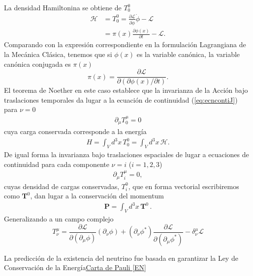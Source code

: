 \begin{frame}
La densidad Hamiltonina se obtiene de $T^0_0$
\begin{align}
  \label{eq:3}
\mathcal{H}&=T^0_0=\frac{\partial\mathcal{L}}{\partial\dot{\phi}}\dot{\phi}
      -\mathcal{L}\\
      &=\pi(x)\frac{\partial\phi(x)}{\partial t}-\mathcal{L}.
\end{align}
Comparando con la expresi\'on correspondiente en la formulaci\'on
Lagrangiana de la Mec\'anica Cl\'asica, tenemos que si $\phi(x)$ es la
variable can\'onica, la variable can\'onica conjugada es $\pi(x)$
\begin{equation}
  \label{eq:4}
  \pi(x)=\frac{\partial\mathcal{L}}{\partial(\partial\phi(x)/\partial t)}.
\end{equation}
El teorema de Noether en este caso establece que la invarianza de la Acci\'on bajo traslaciones temporales da lugar a la ecuación de continuidad (\ref{eq:ecncontiJ}) para $\nu=0$
\begin{align}
\label{eq:122}
  \partial_\mu T^\mu_0=0
\end{align}
cuya carga conservada corresponde a la energía
\begin{align}
  H=\int_V d^3x\, T^0_0=\int_V d^3x\,\mathcal{H}.
\end{align}
De igual forma la invarianza bajo traslaciones espaciales de lugar a ecuaciones de continuidad para cada componente $\nu=i$
 ($i=1,2,3$)
 \begin{align}
   \label{eq:235}
   \partial_\mu T^\mu_i=0,
 \end{align}
cuyas densidad de cargas conservadas, $T^0_i$, que en forma vectorial escribiremos como $\mathbf{T}^0$, dan lugar a la conservaci\'on del momentum
\begin{align}
  \mathbf{P}=\int_V d^3x\,\mathbf{T}^0\,.
\end{align}
Generalizando a un campo complejo
\begin{equation}
  \label{eq:138}
     T^\mu_\nu=\frac{\partial\mathcal{L}}{\partial(\partial_\mu\phi)}(\partial_\nu\phi)+(\partial_\nu\phi^*)\frac{\partial\mathcal{L}}{\partial(\partial_\mu\phi^*)}
      -\delta^\mu_\nu\mathcal{L}
\end{equation}

\end{frame}
La predicción de la existencia del neutrino fue basada en garantizar la Ley de Conservación de la Energía\href{https://www.symmetrymagazine.org/sites/default/files/legacy/pdfs/200703/logbook_letter_translation.pdf}{Carta de Pauli [EN]}


